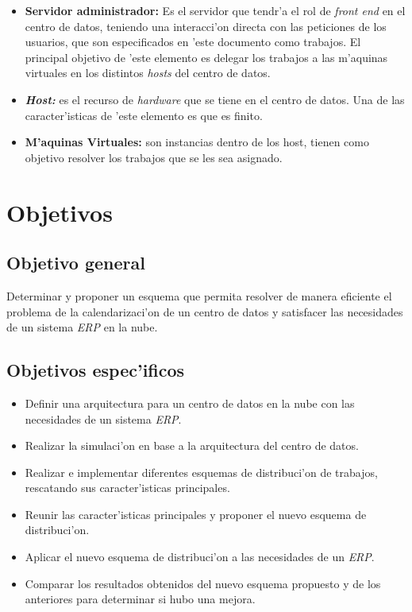 \begin{itemize}
	\item \textbf{Servidor administrador:} Es el servidor que tendr'a el rol de \textit{front end} en el centro de datos, teniendo una interacci'on directa con las peticiones de los usuarios, que son especificados en 'este documento como trabajos.
	El principal objetivo de 'este elemento es delegar los trabajos a las m'aquinas virtuales en los distintos \textit{hosts} del centro de datos.
	\item \textit{\textbf{Host:}} es el recurso de \textit{hardware} que se tiene en el centro de datos. Una de las caracter'isticas de 'este elemento es que es finito.
	\item \textbf{M'aquinas Virtuales:} son instancias dentro de los host, tienen como objetivo resolver los trabajos que se les sea asignado.
\end{itemize}


\newpage

\section*{Objetivos}


\subsection*{Objetivo general}


Determinar y proponer un esquema que permita resolver de manera eficiente el problema de la calendarizaci'on de un centro de datos y satisfacer las necesidades de un sistema \textit{ERP} en la nube.


\subsection*{Objetivos espec'ificos}


\begin{itemize}
	\item Definir una arquitectura para un centro de datos en la nube con las necesidades de un sistema \textit{ERP}.
	\item Realizar la simulaci'on en base a la arquitectura del centro de datos.
	\item Realizar e implementar diferentes esquemas de distribuci'on de trabajos, rescatando sus caracter'isticas principales.
	\item Reunir las caracter'isticas principales y proponer el nuevo esquema de distribuci'on.
	\item Aplicar el nuevo esquema de distribuci'on a las necesidades de un \textit{ERP}.
	\item Comparar los resultados obtenidos del nuevo esquema propuesto y de los anteriores para determinar si hubo una mejora.
\end{itemize}


